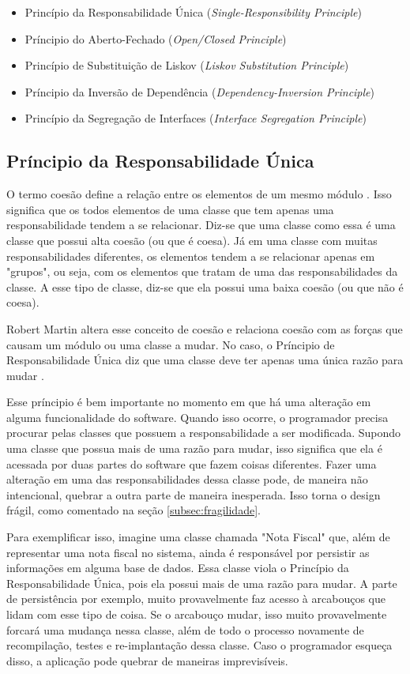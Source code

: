 \begin{itemize}
	\item Princípio da Responsabilidade Única (\textit{Single-Responsibility Principle})
	\item Príncipio do Aberto-Fechado (\textit{Open/Closed Principle})
	\item Princípio de Substituição de Liskov (\textit{Liskov Substitution Principle})
	\item Príncipio da Inversão de Dependência (\textit{Dependency-Inversion Principle})
	\item Princípio da Segregação de Interfaces (\textit{Interface Segregation Principle})
\end{itemize}

\subsection{Príncipio da Responsabilidade Única}
\label{subsec:principio-srp}

O termo coesão define a relação entre os elementos de um mesmo módulo \cite{demarco} \cite{pagejones}. Isso significa que
os todos elementos de uma classe que tem apenas uma responsabilidade tendem a se relacionar. Diz-se que uma classe
como essa é uma classe que possui alta coesão (ou que é coesa). Já em uma classe
com muitas responsabilidades diferentes, os elementos tendem a se relacionar apenas em "grupos", ou seja, com os elementos
que tratam de uma das responsabilidades da classe. A esse tipo de classe, diz-se que ela possui uma baixa coesão (ou que não é
coesa).

Robert Martin altera esse conceito de coesão e relaciona coesão com as forças que causam um módulo ou uma classe a mudar. No caso,
o Príncipio de Responsabilidade Única diz que uma classe deve ter apenas uma única razão para mudar \cite{bob-martin}.

Esse príncipio é bem importante no momento em que há uma alteração em alguma funcionalidade do software. Quando isso ocorre,
o programador precisa procurar pelas classes que possuem a responsabilidade a ser modificada. Supondo uma classe que 
possua mais de uma razão para mudar, isso significa que ela é acessada por duas partes do software que fazem coisas diferentes.
Fazer uma alteração em uma das responsabilidades dessa classe pode, de maneira não intencional, quebrar a outra parte
de maneira inesperada. Isso torna o design frágil, como comentado na seção \ref{subsec:fragilidade}.

Para exemplificar isso, imagine uma classe chamada "Nota Fiscal" que, além de representar uma nota fiscal no sistema, ainda
é responsável por persistir as informações em alguma base de dados. Essa classe viola o Princípio da Responsabilidade Única,
pois ela possui mais de uma razão para mudar. A parte de persistência por exemplo, muito provavelmente faz acesso à arcabouços
que lidam com esse tipo de coisa. Se o arcabouço mudar, isso muito provavelmente forcará uma mudança nessa classe, além de 
todo o processo novamente de recompilação, testes e re-implantação dessa classe. Caso o programador esqueça disso, a aplicação
pode quebrar de maneiras imprevisíveis.

